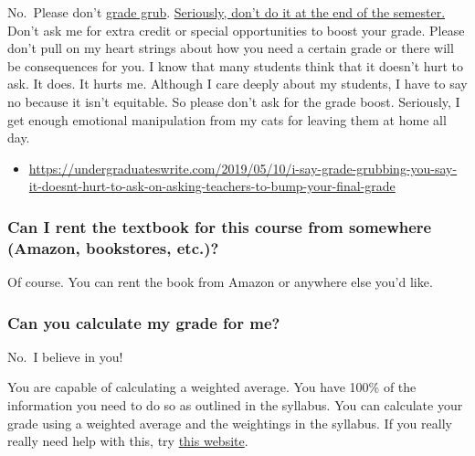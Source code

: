 \documentclass[
]{book}
\providecommand{\tightlist}{%
  \setlength{\itemsep}{0pt}\setlength{\parskip}{0pt}}
\begin{document}
No.~Please don't \href{https://undergraduateswrite.com/2019/05/10/i-say-grade-grubbing-you-say-it-doesnt-hurt-to-ask-on-asking-teachers-to-bump-your-final-grade/}{grade grub}. \href{https://undergraduateswrite.com/2019/05/10/i-say-grade-grubbing-you-say-it-doesnt-hurt-to-ask-on-asking-teachers-to-bump-your-final-grade/}{Seriously, don't do it at the end of the semester.} Don't ask me for extra credit or special opportunities to boost your grade. Please don't pull on my heart strings about how you need a certain grade or there will be consequences for you. I know that many students think that it doesn't hurt to ask. It does. It hurts me. Although I care deeply about my students, I have to say no because it isn't equitable. So please don't ask for the grade boost. Seriously, I get enough emotional manipulation from my cats for leaving them at home all day.

\begin{itemize}
\tightlist
\item
  \url{https://undergraduateswrite.com/2019/05/10/i-say-grade-grubbing-you-say-it-doesnt-hurt-to-ask-on-asking-teachers-to-bump-your-final-grade}
\end{itemize}

\hypertarget{can-i-rent-the-textbook-for-this-course-from-somewhere-amazon-bookstores-etc.}{%
\subsubsection{Can I rent the textbook for this course from somewhere (Amazon, bookstores, etc.)?}\label{can-i-rent-the-textbook-for-this-course-from-somewhere-amazon-bookstores-etc.}}

Of course. You can rent the book from Amazon or anywhere else you'd like.

\hypertarget{can-you-calculate-my-grade-for-me}{%
\subsubsection{Can you calculate my grade for me?}\label{can-you-calculate-my-grade-for-me}}

No.~I believe in you!

You are capable of calculating a weighted average.
You have 100\% of the information you need to do so as outlined in the syllabus.
You can calculate your grade using a weighted average and the weightings in the syllabus.
If you really really need help with this, try \href{https://thegradecalculator.com/}{this website}.
\end{document}
